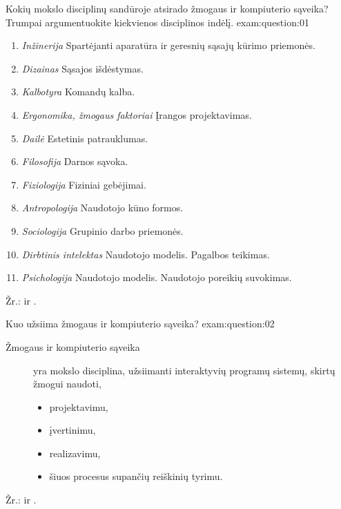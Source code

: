 \begin{question}{%
  Kokių mokslo disciplinų sandūroje atsirado žmogaus ir kompiuterio
  sąveika? Trumpai argumentuokite kiekvienos disciplinos indėlį.
  }{exam:question:01}
  \begin{enumerate}
    \item \emph{Inžinerija} Spartėjanti aparatūra ir geresnių
      sąsajų kūrimo priemonės.
    \item \emph{Dizainas} Sąsajos išdėstymas.
    \item \emph{Kalbotyra} Komandų kalba.
    \item \emph{Ergonomika, žmogaus faktoriai} Įrangos projektavimas.
    \item \emph{Dailė} Estetinis patrauklumas.
    \item \emph{Filosofija} Darnos sąvoka.
    \item \emph{Fiziologija} Fiziniai gebėjimai.
    \item \emph{Antropologija} Naudotojo kūno formos.
    \item \emph{Sociologija} Grupinio darbo priemonės.
    \item \emph{Dirbtinis intelektas} Naudotojo modelis. Pagalbos teikimas.
    \item \emph{Psichologija} Naudotojo modelis. Naudotojo poreikių
      suvokimas.
  \end{enumerate}
  Žr.: \cite[8p.]{konspektas} ir \cite[11--12]{konspektas}.
\end{question}

\begin{question}{%
  Kuo užsiima žmogaus ir kompiuterio sąveika?
  }{exam:question:02}
  \begin{description}
    \item[Žmogaus ir kompiuterio sąveika] yra mokslo disciplina, užsiimanti
      interaktyvių programų sistemų, skirtų žmogui naudoti,
      \begin{itemize}
        \item projektavimu,
        \item įvertinimu,
        \item realizavimu,
        \item šiuos procesus supančių reiškinių tyrimu.
      \end{itemize}
  \end{description}
  Žr.: \cite[8p.]{konspektas} ir \cite[25]{skaidres-1}.
\end{question}

